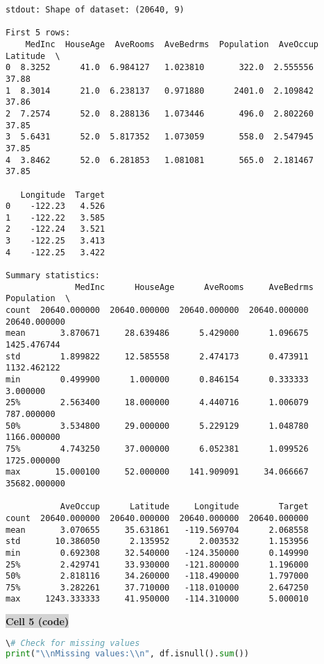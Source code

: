 \documentclass{article}
\begin{document}
\begin{verbatim}
stdout: Shape of dataset: (20640, 9)

First 5 rows:
    MedInc  HouseAge  AveRooms  AveBedrms  Population  AveOccup  Latitude  \
0  8.3252      41.0  6.984127   1.023810       322.0  2.555556     37.88   
1  8.3014      21.0  6.238137   0.971880      2401.0  2.109842     37.86   
2  7.2574      52.0  8.288136   1.073446       496.0  2.802260     37.85   
3  5.6431      52.0  5.817352   1.073059       558.0  2.547945     37.85   
4  3.8462      52.0  6.281853   1.081081       565.0  2.181467     37.85   

   Longitude  Target  
0    -122.23   4.526  
1    -122.22   3.585  
2    -122.24   3.521  
3    -122.25   3.413  
4    -122.25   3.422  

Summary statistics:
              MedInc      HouseAge      AveRooms     AveBedrms    Population  \
count  20640.000000  20640.000000  20640.000000  20640.000000  20640.000000   
mean       3.870671     28.639486      5.429000      1.096675   1425.476744   
std        1.899822     12.585558      2.474173      0.473911   1132.462122   
min        0.499900      1.000000      0.846154      0.333333      3.000000   
25%        2.563400     18.000000      4.440716      1.006079    787.000000   
50%        3.534800     29.000000      5.229129      1.048780   1166.000000   
75%        4.743250     37.000000      6.052381      1.099526   1725.000000   
max       15.000100     52.000000    141.909091     34.066667  35682.000000   

           AveOccup      Latitude     Longitude        Target  
count  20640.000000  20640.000000  20640.000000  20640.000000  
mean       3.070655     35.631861   -119.569704      2.068558  
std       10.386050      2.135952      2.003532      1.153956  
min        0.692308     32.540000   -124.350000      0.149990  
25%        2.429741     33.930000   -121.800000      1.196000  
50%        2.818116     34.260000   -118.490000      1.797000  
75%        3.282261     37.710000   -118.010000      2.647250  
max     1243.333333     41.950000   -114.310000      5.000010  

\end{verbatim}


\vspace{0.5cm}
\noindent\colorbox{lightgray}{\textbf{Cell 5 (code)}}
\vspace{0.3cm}


\begin{lstlisting}[language=Python]
\# Check for missing values
print("\\nMissing values:\\n", df.isnull().sum())
\end{lstlisting}
\end{document}
